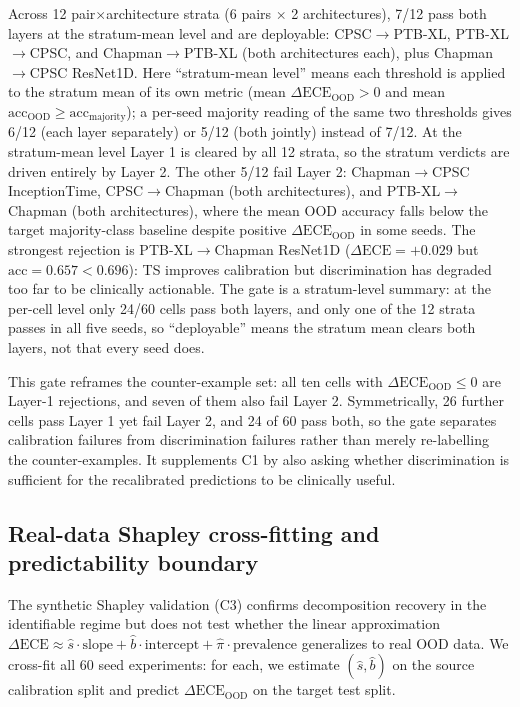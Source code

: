 \documentclass[review,12pt,nonatbib]{elsarticle}
\begin{document}
Across 12 pair$\times$architecture strata (6 pairs $\times$ 2
architectures), 7/12 pass both layers at the stratum-mean level and are
deployable: CPSC$\rightarrow$PTB-XL, PTB-XL$\rightarrow$CPSC, and
Chapman$\rightarrow$PTB-XL (both architectures each), plus
Chapman$\rightarrow$CPSC ResNet1D. Here ``stratum-mean level'' means
each threshold is applied to the stratum mean of its own metric (mean
$\Delta\text{ECE}_{\text{OOD}} > 0$ and mean
$\text{acc}_{\text{OOD}} \geq \text{acc}_{\text{majority}}$); a
per-seed majority reading of the same two thresholds gives 6/12 (each
layer separately) or 5/12 (both jointly) instead of 7/12. At the
stratum-mean level Layer 1 is cleared by all 12 strata, so the stratum
verdicts are driven entirely by Layer 2. The other 5/12 fail Layer 2:
Chapman$\rightarrow$CPSC InceptionTime,
CPSC$\rightarrow$Chapman (both architectures), and
PTB-XL$\rightarrow$Chapman (both architectures), where the mean OOD
accuracy falls below the target majority-class baseline despite positive
$\Delta\text{ECE}_{\text{OOD}}$ in some seeds. The strongest rejection
is PTB-XL$\rightarrow$Chapman ResNet1D ($\Delta\text{ECE}=+0.029$ but
$\text{acc}=0.657 < 0.696$): TS improves calibration but
discrimination has degraded too far to be clinically actionable. The
gate is a stratum-level summary: at the per-cell level only 24/60 cells
pass both layers, and only one of the 12 strata passes in all five
seeds, so ``deployable'' means the stratum mean clears both layers, not
that every seed does.

This gate reframes the counter-example set: all ten cells with
$\Delta\text{ECE}_{\text{OOD}} \leq 0$ are Layer-1 rejections, and seven
of them also fail Layer 2. Symmetrically, 26 further cells pass Layer 1
yet fail Layer 2, and 24 of 60 pass both, so the gate separates
calibration failures from discrimination failures rather than merely
re-labelling the counter-examples. It supplements C1 by also asking
whether discrimination is sufficient for the recalibrated predictions
to be clinically useful.

\subsection{Real-data Shapley cross-fitting and predictability boundary}
\label{sec:real_shapley}
The synthetic Shapley validation (C3) confirms decomposition recovery
in the identifiable regime but does not test whether the linear
approximation $\Delta\text{ECE} \approx \hat{s} \cdot \text{slope} +
\hat{b} \cdot \text{intercept} + \hat{\pi} \cdot \text{prevalence}$
generalizes to real OOD data. We cross-fit all 60 seed experiments:
for each, we estimate $(\hat{s}, \hat{b})$ on the source calibration
split and predict $\Delta\text{ECE}_{\text{OOD}}$ on the target test
split.
\end{document}
